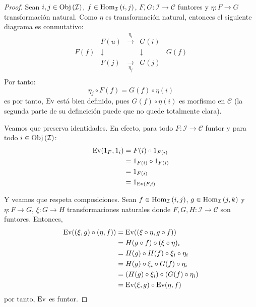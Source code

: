 \documentclass[12pt]{report}
\theoremstyle{largebreak}
\newcommand\cf[3]{\ensuremath{#1:#2\rightarrow#3}}
\newcommand{\Obj}[1]{\ensuremath{\textup{Obj}\left(#1\right)}}
\newcommand{\Hom}[3]{\ensuremath{\textup{Hom}_{#1}\left(#2,#3\right)}}
\newcommand{\Ev}{\ensuremath{\textup{Ev}}}
\begin{document}
    \begin{proof}
        Sean $i,j\in\Obj{\mathcal{I}}$, $f\in\Hom{\mathcal{I}}{i}{j}$, $\cf{F,G}{\mathcal{I}}{\mathcal{C}}$ funtores y $\cf{\eta}{F}{G}$ transformación natural. Como $\eta$ es transformación natural, entonces el siguiente diagrama es conmutativo:
        \begin{equation*}
            \begin{array}{rcccl}
                &F(u) & \overset{\eta_i}{\longrightarrow} & G(i) &\\
                F(f) & \downarrow & & \downarrow & G(f) \\
                &F(j) & \underset{\eta_j}{\longrightarrow} & G(j) &\\
            \end{array}
        \end{equation*}
        Por tanto:
        \begin{equation*}
            \eta_j\circ F(f)=G(f)\circ\eta(i)
        \end{equation*}es
        por tanto, $\Ev$ está bien definido, pues $G(f)\circ\eta(i)$ es morfismo en $\mathcal{C}$ (la segunda parte de su defincición puede que no quede totalmente clara).

        Veamos que preserva identidades. En efecto, para todo $\cf{F}{\mathcal{I}}{\mathcal{C}}$ funtor y para todo $i\in\Obj{\mathcal{I}}$:
        \begin{equation*}
            \begin{split}
                \Ev(1_F,1_i)&=F(i)\circ 1_{F(i)}\\
                &=1_{F(i)}\circ 1_{F(i)}\\
                &=1_{F(i)}\\
                &=1_{\Ev(F,i)}\\
            \end{split}
        \end{equation*}
    
        Y veamos que respeta composiciones. Sean $f\in\Hom{\mathcal{I}}{i}{j}$, $g\in\Hom{\mathcal{I}}{j}{k}$ y $\cf{\eta}{F}{G}$, $\cf{\xi}{G}{H}$ transformaciones naturales donde $\cf{F,G,H}{\mathcal{I}}{\mathcal{C}}$ son funtores. Entonces,
        \begin{equation*}
            \begin{split}
                \Ev((\xi,g)\circ(\eta,f))&=\Ev((\xi\circ\eta,g\circ f))\\
                &=H(g\circ f)\circ(\xi\circ\eta)_i\\
                &=H(g)\circ H(f)\circ\xi_i\circ\eta_i\\
                &=H(g)\circ\xi_i\circ G(f)\circ\eta_i\\
                &=(H(g)\circ\xi_i)\circ (G(f)\circ\eta_i)\\
                &=\Ev(\xi,g)\circ\Ev(\eta,f)\\
            \end{split}
        \end{equation*}
        por tanto, $\Ev$ es funtor.
    \end{proof}
\end{document}
